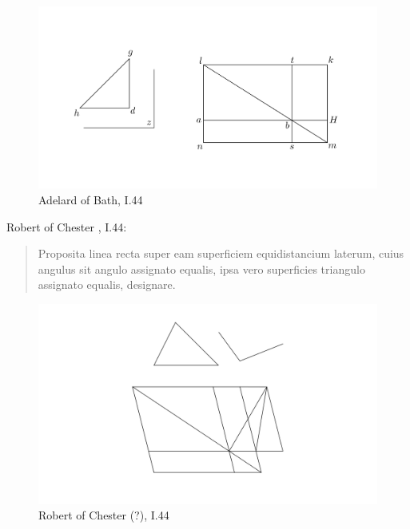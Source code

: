 \documentclass{article}
\begin{document}
\begin{figure}
\begin{center}
\includegraphics{adelardI44.png}
\end{center}
\caption{Adelard of Bath, I.44}
\label{adelardI44}
\end{figure}

Robert of Chester \cite[p.~129]{adelardII}, I.44: 

\begin{quote}
Proposita linea recta super eam superficiem equidistancium laterum, cuius angulus sit angulo assignato equalis, ipsa vero superficies triangulo assignato equalis, designare.
\end{quote}

\begin{figure}
\begin{center}
\includegraphics{chesterI44.png}
\end{center}
\caption{Robert of Chester (?), I.44}
\label{chesterI44}
\end{figure}
\end{document}
